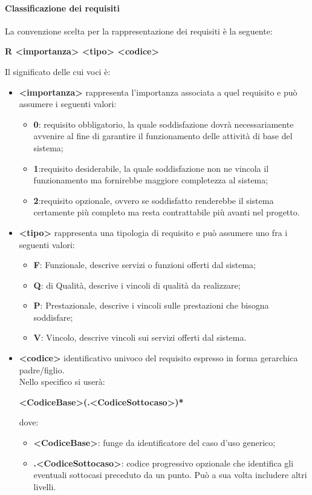 			\paragraph{Classificazione dei requisiti}
				La convenzione scelta per la rappresentazione dei requisiti è la seguente:\\
				\begin{center}
					\textbf{R <importanza> <tipo> <codice>}
				\end{center}
				Il significato delle cui voci è:
				\begin{itemize}
					\item\textbf{<importanza>} rappresenta l’importanza associata a quel requisito e può assumere i seguenti valori:
						\begin{itemize}
							\item\textbf{0}: requisito obbligatorio, la quale soddisfazione dovrà necessariamente avvenire al fine di garantire il funzionamento delle attività di base del sistema;
							\item\textbf{1}:requisito desiderabile, la quale soddisfazione non ne vincola il funzionamento ma fornirebbe maggiore completezza al sistema;
							\item\textbf{2}:requisito opzionale, ovvero se soddisfatto renderebbe il sistema certamente più completo ma resta contrattabile più avanti nel progetto.
						\end{itemize}
					\item\textbf{<tipo>} rappresenta una tipologia di requisito e può assumere uno fra i seguenti valori:
						\begin{itemize}
							\item\textbf{F}: Funzionale, descrive servizi o funzioni offerti dal sistema;
							\item\textbf{Q}: di Qualità, descrive i vincoli di qualità da realizzare;
							\item\textbf{P}: Prestazionale, descrive i vincoli sulle prestazioni che bisogna soddisfare;
							\item\textbf{V}: Vincolo, descrive vincoli sui servizi offerti dal sistema.
						\end{itemize}
						
						
					\item\textbf{<codice>} identificativo univoco del requisito espresso in forma gerarchica padre/figlio. \\
						Nello specifico si userà:\\
						\begin{center}
							\textbf{<CodiceBase>(.<CodiceSottocaso>)*}
						\end{center}
						dove:
						\begin{itemize}
							\item\textbf{<CodiceBase>}: funge da identificatore del caso d’uso generico;
							\item\textbf{.<CodiceSottocaso>}: codice progressivo opzionale che identifica gli eventuali sottocasi preceduto da un punto. Può a sua volta includere altri livelli.
						\end{itemize}
				\end{itemize}
